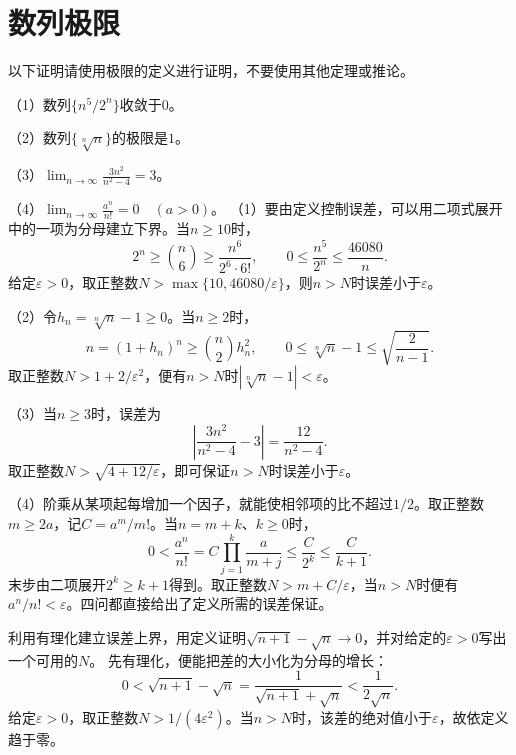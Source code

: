 \par\addvspace{12pt}

\section{数列极限}

\label{sol:sec:analysis:4}

以下证明请使用极限的定义进行证明，不要使用其他定理或推论。

    （1）数列\(\{n^5/2^n\}\)收敛于\(0\)。

    （2）数列\(\{\sqrt[n]{n}\}\)的极限是\(1\)。

    （3）\(\displaystyle\lim_{n\to\infty}\frac{3n^2}{n^2-4}=3\)。

    （4）\(\displaystyle\lim_{n\to\infty}\frac{a^n}{n!}=0\quad(a>0)\)。
\solutionanswer
（1）要由定义控制误差，可以用二项式展开中的一项为分母建立下界。当\(n\ge10\)时，
\[
2^n\ge\binom n6\ge\frac{n^6}{2^6\cdot6!},\qquad
0\le\frac{n^5}{2^n}\le\frac{46080}{n}.
\]
给定\(\varepsilon>0\)，取正整数\(N>\max\{10,46080/\varepsilon\}\)，则\(n>N\)时误差小于\(\varepsilon\)。

（2）令\(h_n=\sqrt[n]n-1\ge0\)。当\(n\ge2\)时，
\[
n=(1+h_n)^n\ge\binom n2h_n^2,\qquad
0\le\sqrt[n]n-1\le\sqrt{\frac2{n-1}}.
\]
取正整数\(N>1+2/\varepsilon^2\)，便有\(n>N\)时\(|\sqrt[n]n-1|<\varepsilon\)。

（3）当\(n\ge3\)时，误差为
\[
\left|\frac{3n^2}{n^2-4}-3\right|=\frac{12}{n^2-4}.
\]
取正整数\(N>\sqrt{4+12/\varepsilon}\)，即可保证\(n>N\)时误差小于\(\varepsilon\)。

（4）阶乘从某项起每增加一个因子，就能使相邻项的比不超过\(1/2\)。取正整数\(m\ge2a\)，记\(C=a^m/m!\)。当\(n=m+k\)、\(k\ge0\)时，
\[
0<\frac{a^n}{n!}=C\prod_{j=1}^k\frac a{m+j}
\le\frac C{2^k}\le\frac C{k+1}.
\]
末步由二项展开\(2^k\ge k+1\)得到。取正整数\(N>m+C/\varepsilon\)，当\(n>N\)时便有\(a^n/n!<\varepsilon\)。四问都直接给出了定义所需的误差保证。


利用有理化建立误差上界，用定义证明\(\sqrt{n+1}-\sqrt n\to0\)，并对给定的\(\varepsilon>0\)写出一个可用的\(N\)。
\solutionanswer
先有理化，便能把差的大小化为分母的增长：
\[
0<\sqrt{n+1}-\sqrt n=\frac1{\sqrt{n+1}+\sqrt n}<\frac1{2\sqrt n}.
\]
给定\(\varepsilon>0\)，取正整数\(N>1/(4\varepsilon^2)\)。当\(n>N\)时，该差的绝对值小于\(\varepsilon\)，故依定义趋于零。


